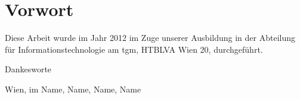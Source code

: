 

\chapter*{Vorwort}

Diese Arbeit wurde im Jahr 2012 im Zuge unserer Ausbildung in der Abteilung für Informationstechnologie am \gls{tgm}, HTBLVA Wien 20, durchgeführt. 


\bigskip

Dankesworte

\bigskip
\bigskip
\bigskip
\bigskip



Wien, im \monthdis \hfill Name, Name, Name, Name \vfill
